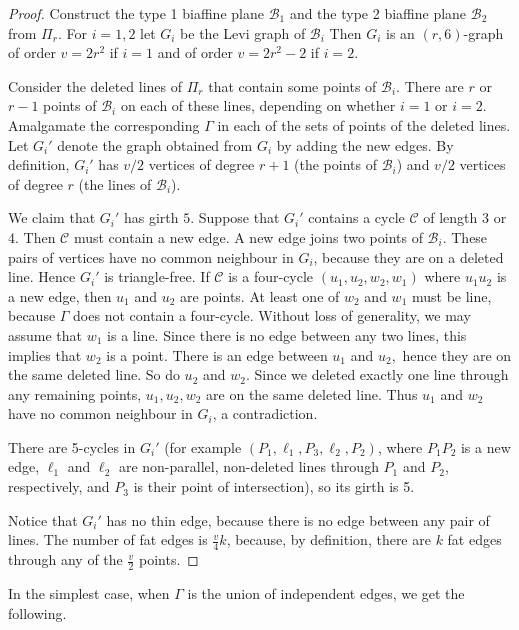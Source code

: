 \documentclass[a4paper,11pt]{article}
\begin{document}
\begin{proof}
Construct the type 1 biaffine plane $\mathcal{B}_1$ and the type 2 biaffine plane $\mathcal{B}_2$
from $\Pi _r$. For $i=1,2$ let $G_i$ be the Levi graph of $\mathcal{B}_i$
Then $G_i$ is an $(r,6)$-graph of order $v=2r^2$ if $i=1$ and of order $v=2r^2-2$ if $i=2$. 

Consider the deleted lines of $\Pi _r$ that contain some points of $\mathcal{B}_i$. There are $r$ 
or $r-1$ points of $\mathcal{B}_i$ on each of these lines, depending on whether $i=1$ or $i=2.$
Amalgamate the corresponding $\Gamma $ in each of the sets of points of the deleted lines.
Let $G_i'$ denote the graph obtained from $G_i$ by adding the new edges. By definition, $G_i'$ has
$v/2$ vertices of degree $r+1$ (the points of $\mathcal{B}_i$) and $v/2$ vertices of degree $r$ (the lines of $\mathcal{B}_i$).

We claim that $G_i'$ has girth $5.$ 
Suppose that $G_i'$ contains a cycle $\mathcal{C}$ of length $3$ or $4$. Then 
$\mathcal{C}$ must contain a new edge. A new edge joins two points of 
$\mathcal{B}_i$. These pairs of vertices have no common neighbour in 
$G_i$, because they are on a deleted line. Hence $G_i'$ is triangle-free. If 
$\mathcal{C}$ is a four-cycle $(u_1,u_2,w_2,w_1)$ where $u_1u_2$ is a new edge, 
then $u_1$ and $u_2$ are points. At least one of $w_2$ and $w_1$ must be line, because
$\Gamma $ does not contain a four-cycle. Without loss of generality, we may assume that $w_1$ is a line.
Since there is no edge between any two lines, this implies that $w_2$ is a point. There is an edge between
$u_1$ and $u_2,$ hence they are on the same deleted line. So do $u_2$ and $w_2$. Since we deleted
exactly one line through any remaining points, $u_1,u_2,w_2$ are on the same deleted line.
Thus $u_1$ and $w_2$ have no common neighbour in $G_i$, a contradiction. 

There are 5-cycles in $G_i'$ (for example $(P_1,\ell_1,P_3,\ell_2,P_2)$, where $P_1P_2$ is a new 
edge, $\ell _1$ and $\ell _2$ are non-parallel, non-deleted lines through $P_1$ and $P_2$, respectively,
and $P_3$ is their point of intersection), so its girth is 5.

Notice that $G_i'$ has no thin edge, because there is no edge between any pair of lines. The 
number of fat edges is $\frac{v}{4}k$, because, by definition, there are $k$ fat edges through any of the  $\frac{v}{2}$ points.
\end{proof}

In the simplest case, when $\Gamma $ is the union of independent edges, we get the following.
\end{document}

